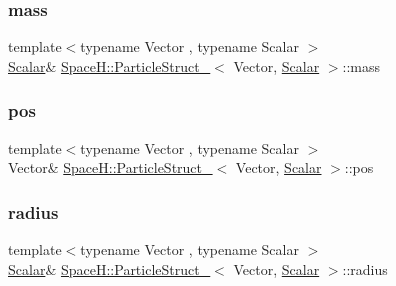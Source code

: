 \subsubsection{\texorpdfstring{mass}{mass}}
{\footnotesize\ttfamily template$<$typename Vector , typename Scalar $>$ \\
\mbox{\hyperlink{create_kepler_8cpp_a8c2981f3f834be9448a6ab06c28748eb}{Scalar}}\& \mbox{\hyperlink{struct_space_h_1_1_particle_struct__}{Space\+H\+::\+Particle\+Struct\+\_\+}}$<$ Vector, \mbox{\hyperlink{create_kepler_8cpp_a8c2981f3f834be9448a6ab06c28748eb}{Scalar}} $>$\+::mass}

\mbox{\label{struct_space_h_1_1_particle_struct___a611eb4fe7fba3e1b6615322399627b25}} 
\subsubsection{\texorpdfstring{pos}{pos}}
{\footnotesize\ttfamily template$<$typename Vector , typename Scalar $>$ \\
Vector\& \mbox{\hyperlink{struct_space_h_1_1_particle_struct__}{Space\+H\+::\+Particle\+Struct\+\_\+}}$<$ Vector, \mbox{\hyperlink{create_kepler_8cpp_a8c2981f3f834be9448a6ab06c28748eb}{Scalar}} $>$\+::pos}

\mbox{\label{struct_space_h_1_1_particle_struct___aeae3107d6a3a33fbcfe323eb54c4b5ec}} 
\subsubsection{\texorpdfstring{radius}{radius}}
{\footnotesize\ttfamily template$<$typename Vector , typename Scalar $>$ \\
\mbox{\hyperlink{create_kepler_8cpp_a8c2981f3f834be9448a6ab06c28748eb}{Scalar}}\& \mbox{\hyperlink{struct_space_h_1_1_particle_struct__}{Space\+H\+::\+Particle\+Struct\+\_\+}}$<$ Vector, \mbox{\hyperlink{create_kepler_8cpp_a8c2981f3f834be9448a6ab06c28748eb}{Scalar}} $>$\+::radius}

\mbox{\label{struct_space_h_1_1_particle_struct___a110dd25faafb71a22e076a133cd6d547}} 
